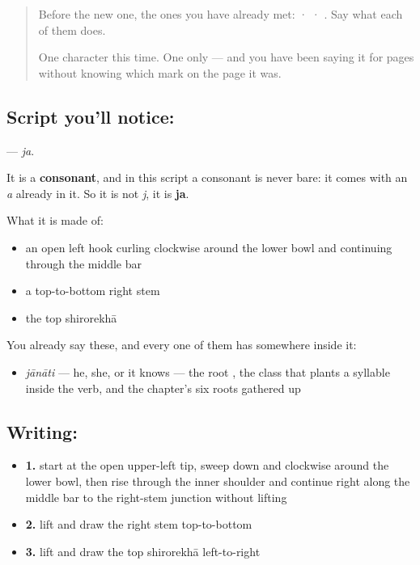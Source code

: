 \label{lesson:SA-S120-letter-ja}



\begin{quote}
Before the new one, the ones you have already met:  ·  · . Say what each of them does.

One character this time. One only — and you have been saying it for pages without knowing which mark on the page it was.
\end{quote}

\subsection*{Script you'll notice: }
\textbf{} — \emph{ja}.

It is a \textbf{consonant}, and in this script a consonant is never bare: it comes with an \emph{a} already in it. So it is not \emph{j}, it is \textbf{ja}.

What it is made of:

\begin{itemize}
\raggedright
  \item an open left hook curling clockwise around the lower bowl and continuing through the middle bar
  \item a top-to-bottom right stem
  \item the top shirorekhā
\end{itemize}

You already say these, and every one of them has  somewhere inside it:

\begin{itemize}
\raggedright
  \item \textbf{} \emph{jānāti} — he, she, or it knows — the root , the class that plants a syllable inside the verb, and the chapter's six roots gathered up
\end{itemize}

\subsection*{Writing: }

\begin{itemize}
\raggedright
  \item \textbf{1.} start at the open upper-left tip, sweep down and clockwise around the lower bowl, then rise through the inner shoulder and continue right along the middle bar to the right-stem junction without lifting
  \item \textbf{2.} lift and draw the right stem top-to-bottom
  \item \textbf{3.} lift and draw the top shirorekhā left-to-right
\end{itemize}

